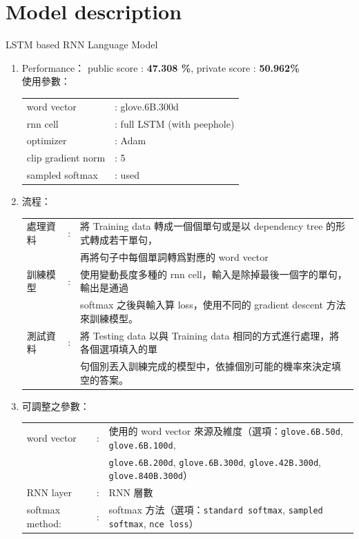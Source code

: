 \documentclass[12pt, a4paper]{article}
\theoremstyle{mystyle}	%
\begin{document}
\section{Model description}
LSTM based RNN Language Model
\begin{enumerate}
  \item Performance：
    public score : \textbf{47.308 \%}, private score : \textbf{50.962\%}\\
  使用參數：\\
  \begin{tabular}{ll}
    word vector     & : glove.6B.300d \\
    rnn cell        & : full LSTM (with peephole) \\
    optimizer       & : Adam  \\
    clip gradient norm & : 5 \\
    sampled softmax & : used \\
  \end{tabular}
  \item 流程：\\
    \begin{tabular}{lcl}
      處理資料 & : & 將 Training data 轉成一個個單句或是以 dependency tree 的形式轉成若干單句，\\
               &   & 再將句子中每個單詞轉爲對應的 word vector \\
      訓練模型 & : & 使用變動長度多種的 rnn cell，輸入是除掉最後一個字的單句，輸出是通過  \\
               &   & softmax 之後與輸入算 loss，使用不同的 gradient descent 方法來訓練模型。\\
      測試資料 & : & 將 Testing data 以與 Training data 相同的方式進行處理，將各個選項填入的單 \\
               &   & 句個別丟入訓練完成的模型中，依據個別可能的機率來決定填空的答案。\\
    \end{tabular}
  \item 可調整之參數：\\
    \begin{tabular}{lcl}
      word vector & : & 使用的 word vector 來源及維度（選項：\texttt{glove.6B.50d}, \texttt{glove.6B.100d}, \\
                &  & \texttt{glove.6B.200d}, \texttt{glove.6B.300d}, \texttt{glove.42B.300d}, \texttt{glove.840B.300d}）\\
      RNN layer & : & RNN 層數 \\
      softmax method: & : & softmax 方法（選項：\texttt{standard softmax}, \texttt{sampled softmax}, \texttt{nce loss}） \\

\end{tabular}
\end{enumerate}
\end{document}
